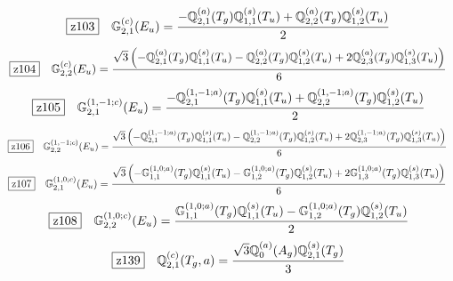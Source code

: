 \documentclass[fleqn,10pt,landscape]{jsarticle}
\begin{document}
\begin{dmath*}
\hspace*{3mm}\fbox{z103}\quad \mathbb{G}_{2,1}^{(c)}(E_{u})=\frac{- \mathbb{Q}_{2,1}^{(a)}(T_{g}) \mathbb{Q}_{1,1}^{(s)}(T_{u}) + \mathbb{Q}_{2,2}^{(a)}(T_{g}) \mathbb{Q}_{1,2}^{(s)}(T_{u})}{2}
\end{dmath*}
\begin{dmath*}
\hspace*{3mm}\fbox{z104}\quad \mathbb{G}_{2,2}^{(c)}(E_{u})=\frac{\sqrt{3} \left(- \mathbb{Q}_{2,1}^{(a)}(T_{g}) \mathbb{Q}_{1,1}^{(s)}(T_{u}) - \mathbb{Q}_{2,2}^{(a)}(T_{g}) \mathbb{Q}_{1,2}^{(s)}(T_{u}) + 2 \mathbb{Q}_{2,3}^{(a)}(T_{g}) \mathbb{Q}_{1,3}^{(s)}(T_{u})\right)}{6}
\end{dmath*}
\begin{dmath*}
\hspace*{3mm}\fbox{z105}\quad \mathbb{G}_{2,1}^{(1,-1;c)}(E_{u})=\frac{- \mathbb{Q}_{2,1}^{(1,-1;a)}(T_{g}) \mathbb{Q}_{1,1}^{(s)}(T_{u}) + \mathbb{Q}_{2,2}^{(1,-1;a)}(T_{g}) \mathbb{Q}_{1,2}^{(s)}(T_{u})}{2}
\end{dmath*}
\begin{dmath*}
\hspace*{3mm}\fbox{z106}\quad \mathbb{G}_{2,2}^{(1,-1;c)}(E_{u})=\frac{\sqrt{3} \left(- \mathbb{Q}_{2,1}^{(1,-1;a)}(T_{g}) \mathbb{Q}_{1,1}^{(s)}(T_{u}) - \mathbb{Q}_{2,2}^{(1,-1;a)}(T_{g}) \mathbb{Q}_{1,2}^{(s)}(T_{u}) + 2 \mathbb{Q}_{2,3}^{(1,-1;a)}(T_{g}) \mathbb{Q}_{1,3}^{(s)}(T_{u})\right)}{6}
\end{dmath*}
\begin{dmath*}
\hspace*{3mm}\fbox{z107}\quad \mathbb{G}_{2,1}^{(1,0;c)}(E_{u})=\frac{\sqrt{3} \left(- \mathbb{G}_{1,1}^{(1,0;a)}(T_{g}) \mathbb{Q}_{1,1}^{(s)}(T_{u}) - \mathbb{G}_{1,2}^{(1,0;a)}(T_{g}) \mathbb{Q}_{1,2}^{(s)}(T_{u}) + 2 \mathbb{G}_{1,3}^{(1,0;a)}(T_{g}) \mathbb{Q}_{1,3}^{(s)}(T_{u})\right)}{6}
\end{dmath*}
\begin{dmath*}
\hspace*{3mm}\fbox{z108}\quad \mathbb{G}_{2,2}^{(1,0;c)}(E_{u})=\frac{\mathbb{G}_{1,1}^{(1,0;a)}(T_{g}) \mathbb{Q}_{1,1}^{(s)}(T_{u}) - \mathbb{G}_{1,2}^{(1,0;a)}(T_{g}) \mathbb{Q}_{1,2}^{(s)}(T_{u})}{2}
\end{dmath*}
\begin{dmath*}
\hspace*{3mm}\fbox{z139}\quad \mathbb{Q}_{2,1}^{(c)}(T_{g},a)=\frac{\sqrt{3} \mathbb{Q}_{0}^{(a)}(A_{g}) \mathbb{Q}_{2,1}^{(s)}(T_{g})}{3}
\end{dmath*}
\end{document}
